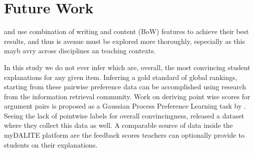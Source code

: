 \documentclass[runningheads]{llncs}
\begin{document}
\section{Future Work}
\cite{nguyen_computational_2015} and \cite{louis_what_2013} use combination of 
writing and content (BoW) features to achieve their best results, and thus is 
avenue must be explored more thoroughly, especially as this mayb avry across 
disciplines an teaching contexts.

In this study we do not ever infer which are, overall, the most convincing 
student explanations for any given item. Inferring a gold standard of global 
rankings, starting from these pairwise preference data can be accomplished 
using research from the information retrieval 
community\cite{chen_pairwise_2013}. Work on deriving point wise scores for 
argument pairs is proposed as a Gaussian Process Preference Learning task by 
\cite{simpson_finding_2018}. Seeing the lack of pointwise labels for overall 
convincingness, \cite{toledo_automatic_2019} released a dataset where they 
collect this data as well. A comparable source of data inside the myDALITE 
platform are the feedback scores teachers can optionally provide to students on 
their explanations.


 
 
\end{document}
